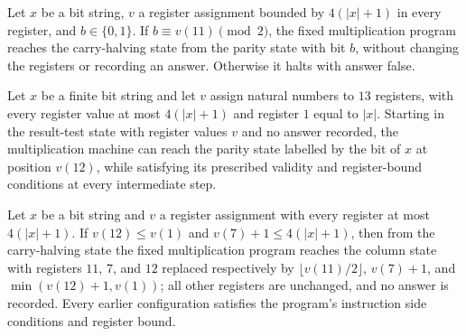 \begin{lemma}
\label{Complexity.mult_parity}
\leanok
{}
Let $x$ be a bit string, $v$ a register assignment bounded by $4(|x|+1)$ in every
register, and $b\in\{0,1\}$. If $b\equiv v(11)\pmod 2$, the fixed multiplication program
reaches the carry-halving state from the parity state with bit $b$, without changing the
registers or recording an answer. Otherwise it halts with answer false.
\end{lemma}

\begin{lemma}
\label{Complexity.mult_result_read}
\leanok
{}
Let $x$ be a finite bit string and let $v$ assign natural numbers to $13$ registers,
with every register value at most $4(|x|+1)$ and register $1$ equal to $|x|$. Starting
in the result-test state with register values $v$ and no answer recorded, the
multiplication machine can reach the parity state labelled by the bit of $x$ at position
$v(12)$, while satisfying its prescribed validity and register-bound conditions at every
intermediate step.
\end{lemma}

\begin{lemma}
\label{Complexity.mult_next_column}
\leanok
{}
Let $x$ be a bit string and $v$ a register assignment with every register at most
$4(|x|+1)$. If $v(12)\le v(1)$ and $v(7)+1\le 4(|x|+1)$, then from the carry-halving
state the fixed multiplication program reaches the column state with registers $11$,
$7$, and $12$ replaced respectively by $\lfloor v(11)/2\rfloor$, $v(7)+1$, and
$\min(v(12)+1,v(1))$; all other registers are unchanged, and no answer is recorded.
Every earlier configuration satisfies the program's instruction side conditions and
register bound.
\end{lemma}

